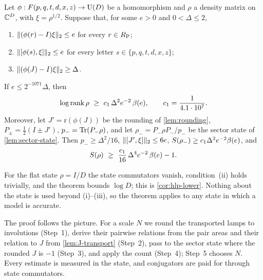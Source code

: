 \begin{theorem}\label{thm:sector}
Let $\phi:F(p,q,t,d,x,z)\to\mathrm U(D)$ be a homomorphism and $\rho$ a density matrix on $\mathbb C^D$, with $\xi=\rho^{1/2}$. Suppose that, for some
$e>0$ and $0<\Delta\le2$,
\begin{enumerate}[label=(\roman*),itemsep=1pt]
\item $\lVert (\phi(r)-I)\xi\rVert_2\le e$ for every $r\in R_{\mathrm P}$;
\item $\lVert [\phi(s),\xi]\rVert_2\le e$ for every letter $s\in\{p,q,t,d,x,z\}$;
\item $\lVert (\phi(J)-I)\xi\rVert_2\ge\Delta$.
\end{enumerate}
If $e\le2^{-1071}\Delta$, then
\[
\log\rank\rho\ \ge\ c_1\,\Delta^2e^{-2}\,\bfun(e),\qquad c_1=\frac1{4.1\cdot10^7}.
\]
Moreover, let $J'=\mathrm r(\phi(J))$ be the rounding of \cref{lem:rounding}, $P_\pm=\frac12(I\pm J')$, $p_-=\operatorname{Tr}(P_-\rho)$, and let
$\rho_-=P_-\rho P_-/p_-$ be the sector state of \cref{lem:sector-state}. Then $p_-\ge\Delta^2/16$, $\lVert [J',\xi]\rVert_2\le6e$,
$S(\rho_-)\ge c_1\Delta^2e^{-2}\beta(e)$, and
\[
S(\rho)\ \ge\ \frac{c_1}{16}\,\Delta^4e^{-2}\,\bfun(e)-1 .
\]
\end{theorem}

For the flat state $\rho=I/D$ the state commutators vanish, condition~(ii) holds trivially, and the theorem bounds $\log D$; this is
\cref{cor:hlp-lower}. Nothing about the state is used beyond (i)--(iii), so the theorem applies to any state in which a model is
accurate.

The proof follows the picture. For a scale $N$ we round the transported lamps to involutions (Step~1), derive their pairwise relations
from the pair areas and their relation to $J$ from \cref{lem:J-transport} (Step~2), pass to the sector state where the rounded $J$ is
$-1$ (Step~3), and apply the count (Step~4); Step~5 chooses $N$. Every estimate is measured in the state, and conjugators are paid for
through state commutators.

